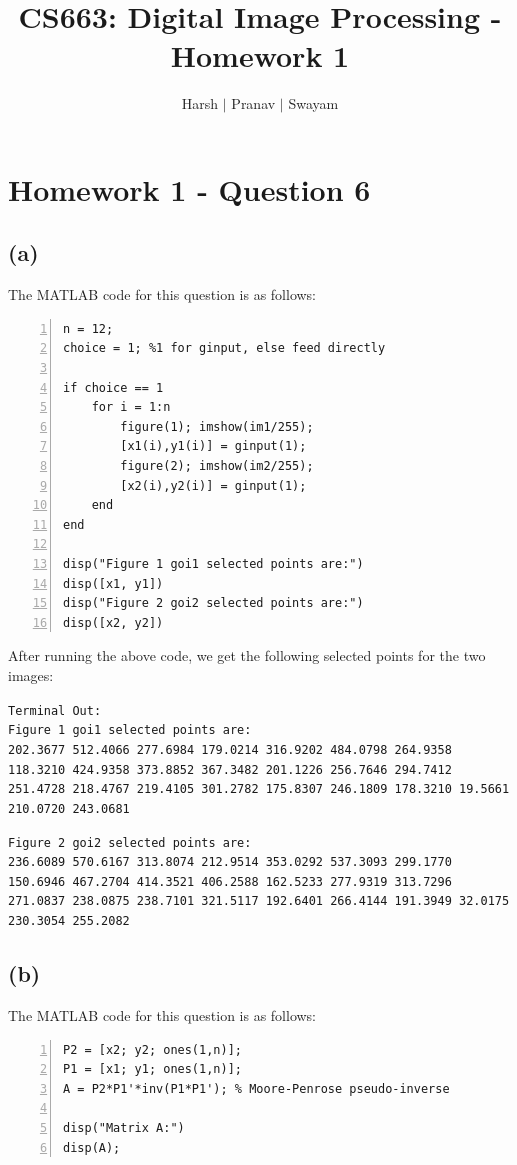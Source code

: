 \documentclass{article}
\title{CS663: Digital Image Processing - Homework 1}
\author{Harsh $\vert$ Pranav $\vert$ Swayam}
\begin{document}
\maketitle
\section{Homework 1 - Question 6}

\subsection*{(a)}

The MATLAB code for this question is as follows:
\begin{lstlisting}[frame=single,numbers=left,style=Matlab-Pyglike,breaklines=true,postbreak=\mbox{\textcolor{red}{$\hookrightarrow$}\space}]    
n = 12;
choice = 1; %1 for ginput, else feed directly

if choice == 1
    for i = 1:n
        figure(1); imshow(im1/255); 
        [x1(i),y1(i)] = ginput(1);
        figure(2); imshow(im2/255); 
        [x2(i),y2(i)] = ginput(1);
    end
end

disp("Figure 1 goi1 selected points are:")
disp([x1, y1])
disp("Figure 2 goi2 selected points are:")
disp([x2, y2])
\end{lstlisting}

After running the above code, we get the following selected points for the two images:

\texttt{Terminal Out:\\
Figure 1 goi1 selected points are:\\
   202.3677  512.4066  277.6984  179.0214  316.9202  484.0798  264.9358  118.3210  424.9358  373.8852  367.3482  201.1226  256.7646  294.7412  251.4728  218.4767  219.4105  301.2782  175.8307  246.1809  178.3210   19.5661  210.0720  243.0681
}

\texttt{Figure 2 goi2 selected points are:\\
   236.6089  570.6167  313.8074  212.9514  353.0292  537.3093  299.1770  150.6946  467.2704  414.3521  406.2588  162.5233  277.9319  313.7296  271.0837  238.0875  238.7101  321.5117  192.6401  266.4144  191.3949   32.0175  230.3054  255.2082
}

\subsection*{(b)}

The MATLAB code for this question is as follows:
\begin{lstlisting}[frame=single,numbers=left,style=Matlab-Pyglike,breaklines=true,postbreak=\mbox{\textcolor{red}{$\hookrightarrow$}\space}]
P2 = [x2; y2; ones(1,n)];
P1 = [x1; y1; ones(1,n)];
A = P2*P1'*inv(P1*P1'); % Moore-Penrose pseudo-inverse

disp("Matrix A:")
disp(A);
\end{lstlisting}
\end{document}
